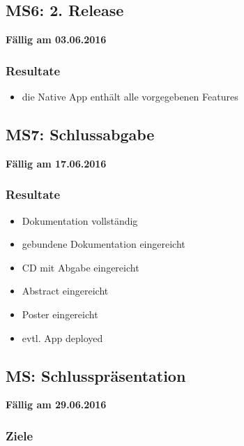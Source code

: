 \subsection{MS6: 2. Release}
\label{pm-ms6}
\textbf{Fällig am 03.06.2016}
\subsubsection{Resultate}
\begin{itemize}
	\item die Native App enthält alle vorgegebenen Features
\end{itemize}

\subsection{MS7: Schlussabgabe}
\label{pm-ms7}
\textbf{Fällig am 17.06.2016}
\subsubsection{Resultate}
\begin{itemize}
	\item Dokumentation vollständig
	\item gebundene Dokumentation eingereicht
	\item CD mit Abgabe eingereicht
	\item Abstract eingereicht
	\item Poster eingereicht
	\item evtl. App deployed
\end{itemize}

\subsection{MS: Schlusspräsentation}
\label{pm-m8}
\textbf{Fällig am 29.06.2016}
\subsubsection{Ziele}
